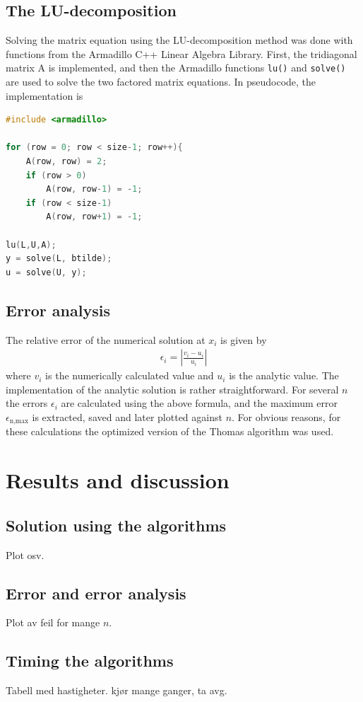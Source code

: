 \documentclass[a4paper,11pt, english, twoside]{article}
\begin{document}
\subsection{The LU-decomposition}
Solving the matrix equation using the LU-decomposition method was done with
functions from the Armadillo C++ Linear Algebra Library. First, the tridiagonal
matrix A is implemented, and then the Armadillo functions \texttt{lu()} and \texttt{solve()}
are used to solve the two factored matrix equations. In pseudocode, the implementation is
\begin{lstlisting}[language=cpp, caption={Pseudocode of LU-decomposition method implementation}]
#include <armadillo>

for (row = 0; row < size-1; row++){
    A(row, row) = 2;
    if (row > 0)
        A(row, row-1) = -1;
    if (row < size-1)
        A(row, row+1) = -1;

lu(L,U,A);
y = solve(L, btilde);
u = solve(U, y);
\end{lstlisting}
\subsection{Error analysis}
The relative error of the numerical solution at $x_i$ is given by
\begin{align*}
  \epsilon_i = \left| \frac{v_i - u_i}{u_i} \right|
\end{align*}
where $v_i$ is the numerically calculated value and $u_i$ is the analytic value.
The implementation of the analytic solution is rather straightforward. For several
$n$ the errors $\epsilon_i$ are calculated using the above formula, and the
maximum error $\epsilon_\text{n,max}$ is extracted, saved and later plotted against $n$.
For obvious reasons, for these calculations the optimized version of the Thomas algorithm was used.
\section{Results and discussion}
\subsection{Solution using the algorithms}
Plot osv.
\subsection{Error and error analysis}
Plot av feil for mange $n$.
\subsection{Timing the algorithms}
Tabell med hastigheter. kjør mange ganger, ta avg.
\end{document}
